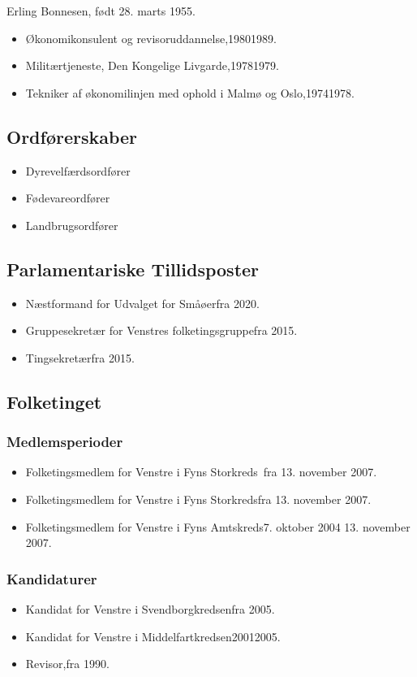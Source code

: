 \documentclass[11pt, a4paper]{awesome-cv}
\begin{document}
\makecvheader[R]
\makelettertitle
\begin{cvletter}
Erling Bonnesen, født 28. marts 1955.

\begin{itemize}
\item Økonomikonsulent og revisoruddannelse,19801989.
\item Militærtjeneste, Den Kongelige Livgarde,19781979.
\item Tekniker af økonomilinjen med ophold i Malmø og Oslo,19741978.
\end{itemize}
\subsection*{Ordførerskaber}
\begin{itemize}
\item Dyrevelfærdsordfører
\item Fødevareordfører
\item Landbrugsordfører
\end{itemize}
\subsection*{Parlamentariske Tillidsposter}
\begin{itemize}
\item Næstformand for Udvalget for Småøerfra 2020.
\item Gruppesekretær for Venstres folketingsgruppefra 2015.
\item Tingsekretærfra 2015.
\end{itemize}
\subsection*{Folketinget}
\subsubsection*{Medlemsperioder}
\begin{itemize}
\item Folketingsmedlem for Venstre i Fyns Storkreds fra 13. november 2007.
\item Folketingsmedlem for Venstre i Fyns Storkredsfra 13. november 2007.
\item Folketingsmedlem for Venstre i Fyns Amtskreds7. oktober 2004  13. november 2007.
\end{itemize}
\subsubsection*{Kandidaturer}
\begin{itemize}
\item Kandidat for Venstre i Svendborgkredsenfra 2005.
\item Kandidat for Venstre i Middelfartkredsen20012005.
\end{itemize}
\begin{itemize}
\item Revisor,fra 1990.
\end{itemize}
\end{cvletter}
\end{document}
